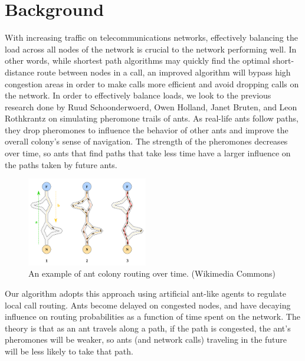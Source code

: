 
\section{Background}
\label{sec:background}

With increasing traffic on telecommunications networks, effectively balancing the load across all nodes of the network is crucial to the network performing well. In other words, while shortest path algorithms may quickly find the optimal short-distance route between nodes in a call, an improved algorithm will bypass high congestion areas in order to make calls more efficient and avoid dropping calls on the network. In order to effectively balance loads, we look to the previous research done by Ruud Schoonderwoerd, Owen Holland, Janet Bruten, and Leon Rothkrantz on simulating pheromone trails of ants. As real-life ants follow paths, they drop pheromones to influence the behavior of other ants and improve the overall colony’s sense of navigation. The strength of the pheromones decreases over time, so ants that find paths that take less time have a larger influence on the paths taken by future ants. \\

\begin{figure}[htb]

  \centering
  \includegraphics[width=0.47\textwidth]{figs/ants_nature.jpg}
  \caption{An example of ant colony routing over time. (Wikimedia Commons)}
  \label{fig:tex}

\end{figure}

Our algorithm adopts this approach using artificial ant-like agents to regulate local call routing. Ants become delayed on congested nodes, and have decaying influence on routing probabilities as a function of time spent on the network. The theory is that as an ant travels along a path, if the path is congested, the ant's pheromones will be weaker, so ants (and network calls) traveling in the future will be less likely to take that path.